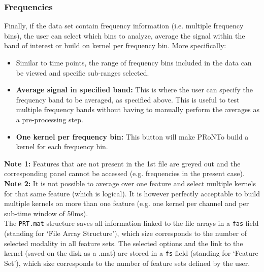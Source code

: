 \subsubsection{Frequencies}

Finally, if the data set contain frequency information (i.e. multiple frequency bins), the user can select which bins to analyze, average the signal within the band of interest or build on kernel per frequency bin. More specifically:

\begin{itemize}

\item Similar to time points, the range of frequency bins included in the data can be viewed and specific sub-ranges selected.

\item \textbf{Average signal in specified band:} This is where the user can specify the frequency band to be averaged, as specified above. This is useful to test multiple frequency bands without having to manually perform the averages as a pre-processing step.

\item \textbf{One kernel per frequency bin:} This button will make PRoNTo build a kernel for each frequency bin.
\end{itemize}






\noindent \textbf{Note 1:} Features that are not present in the 1st file are greyed out and the corresponding panel cannot be accessed (e.g. frequencies in the present case).
\\

\noindent \textbf{Note 2:} It is not possible to average over one feature and select multiple kernels for that same feature (which is logical). It is however perfectly acceptable to build multiple kernels on more than one feature (e.g. one kernel per channel and per sub-time window of 50ms).
\\

The {\tt PRT.mat} structure saves all information linked to the file arrays in a {\tt fas} field (standing for `File Array Structure'), which size corresponds to the number of selected modality in all feature sets. The selected options and the link to the kernel (saved on the disk as a .mat) are stored in a {\tt fs} field (standing for `Feature Set'), which size corresponds to the number of feature sets defined by the user.
\\

